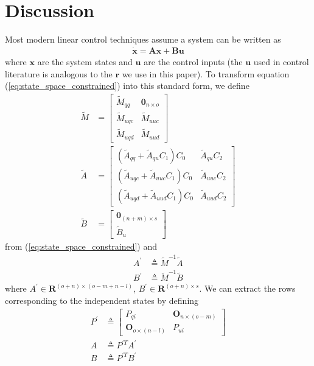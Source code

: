 \documentclass[smallcondensed,final]{svjour3}                     %
\begin{document}
\section{Discussion}
\label{sec:discussion}
Most modern linear control techniques assume a system can be written as
\begin{align}
\dot{\mathbf{x}} = \mathbf{A}\mathbf{x} + \mathbf{B}\mathbf{u}
\end{align}
where $\mathbf{x}$ are the system states and $\mathbf{u}$ are the control
inputs (the $\mathbf{u}$ used in control literature is analogous to the
$\mathbf{r}$ we use in this paper).  To transform equation
(\ref{eq:state_space_constrained}) into this standard form, we define
\begin{align}
\tilde{M} &=
\left[
\begin{array}{cc}
  \tilde{M}_{qq} & \bm{0}_{n \times o} \\
  \tilde{M}_{uqc} & \tilde{M}_{uuc} \\
  \tilde{M}_{uqd} & \tilde{M}_{uud}
\end{array}
\right]\\
\tilde{A} &=
   \left[
     \begin{array}{cc}
       (\tilde{A}_{qq} + \tilde{A}_{qu} C_1 ) C_0 & \tilde{A}_{qu} C_2 \\
       (\tilde{A}_{uqc} + \tilde{A}_{uuc} C_1 ) C_0 & \tilde{A}_{uuc} C_2\\
       (\tilde{A}_{uqd} + \tilde{A}_{uud} C_1 ) C_0 & \tilde{A}_{uud} C_2
     \end{array}
   \right]\\
\tilde{B} &=
    \left[
      \begin{array}{c}
        \bm{0}_{(n+m) \times s} \\
        \tilde{B}_{u}
      \end{array}
    \right]
\end{align}
from (\ref{eq:state_space_constrained}) and
\begin{align}
  \label{eq:A_prime}
    A^\prime &\triangleq \tilde{M}^{-1} \tilde{A} \\
  \label{eq:B_prime}
    B^\prime &\triangleq \tilde{M}^{-1} \tilde{B}
\end{align}
where  $A^\prime \in \bm{R}^{(o + n) \times (o - m + n -l)}$, $B^\prime \in
\bm{R}^{(o + n) \times s}$.  We can extract the rows corresponding to the
independent states by defining
\begin{align}
  \label{eq:P_prime}
    P^\prime &\triangleq \begin{bmatrix}
        P_{qi} & \bm{O}_{n \times (o - m)} \\
        \bm{O}_{o \times (n - l)} & P_{ui}
    \end{bmatrix} \\
  \label{eq:A}
    A &\triangleq P^{\prime T} A^\prime \\
  \label{eq:B}
    B &\triangleq P^{\prime T} B^\prime
\end{align}
\end{document}
